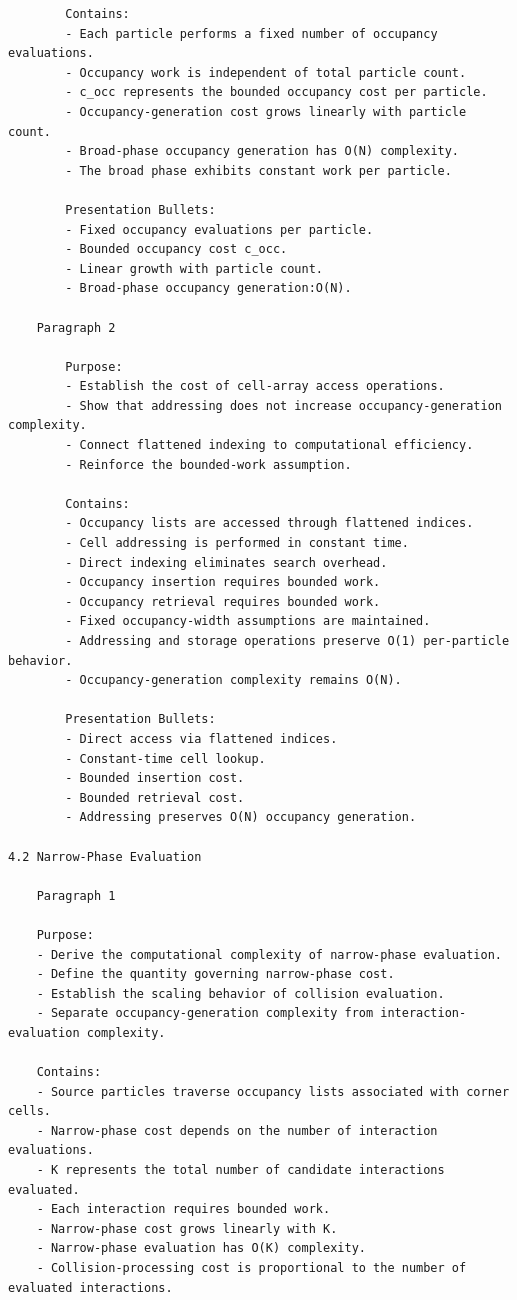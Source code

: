 \begin{verbatim}
		Contains:
		- Each particle performs a fixed number of occupancy evaluations.
		- Occupancy work is independent of total particle count.
		- c_occ represents the bounded occupancy cost per particle.
		- Occupancy-generation cost grows linearly with particle count.
		- Broad-phase occupancy generation has O(N) complexity.
		- The broad phase exhibits constant work per particle.

		Presentation Bullets:
		- Fixed occupancy evaluations per particle.
		- Bounded occupancy cost c_occ.
		- Linear growth with particle count.
		- Broad-phase occupancy generation:O(N).

	Paragraph 2

		Purpose:
		- Establish the cost of cell-array access operations.
		- Show that addressing does not increase occupancy-generation complexity.
		- Connect flattened indexing to computational efficiency.
		- Reinforce the bounded-work assumption.

		Contains:
		- Occupancy lists are accessed through flattened indices.
		- Cell addressing is performed in constant time.
		- Direct indexing eliminates search overhead.
		- Occupancy insertion requires bounded work.
		- Occupancy retrieval requires bounded work.
		- Fixed occupancy-width assumptions are maintained.
		- Addressing and storage operations preserve O(1) per-particle behavior.
		- Occupancy-generation complexity remains O(N).

		Presentation Bullets:
		- Direct access via flattened indices.
		- Constant-time cell lookup.
		- Bounded insertion cost.
		- Bounded retrieval cost.
		- Addressing preserves O(N) occupancy generation.

4.2 Narrow-Phase Evaluation

	Paragraph 1

	Purpose:
	- Derive the computational complexity of narrow-phase evaluation.
	- Define the quantity governing narrow-phase cost.
	- Establish the scaling behavior of collision evaluation.
	- Separate occupancy-generation complexity from interaction-evaluation complexity.

	Contains:
	- Source particles traverse occupancy lists associated with corner cells.
	- Narrow-phase cost depends on the number of interaction evaluations.
	- K represents the total number of candidate interactions evaluated.
	- Each interaction requires bounded work.
	- Narrow-phase cost grows linearly with K.
	- Narrow-phase evaluation has O(K) complexity.
	- Collision-processing cost is proportional to the number of evaluated interactions.


\end{verbatim}
